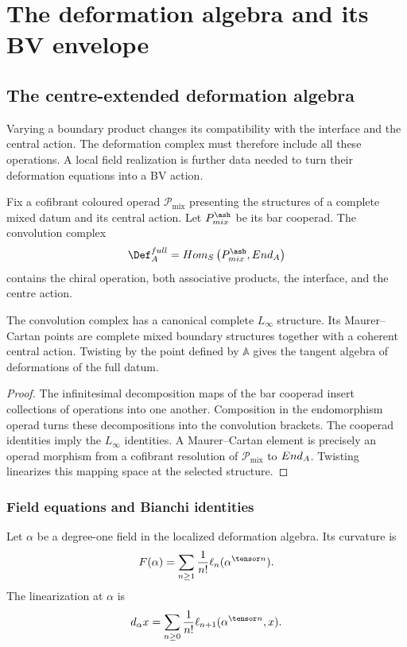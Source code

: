 \part{The deformation algebra and its BV envelope}


\chapter{The centre-extended deformation algebra}
Varying a boundary product changes its compatibility with the interface and the central action. The deformation complex must therefore include all these operations. A local field realization is further data needed to turn their deformation equations into a BV action.

Fix a cofibrant coloured operad $\mathcal P_{\mathrm{mix}}$ presenting the structures of a complete mixed datum and its central action.  Let $\mathcal P_{\mathrm{mix}}^{\ash}$ be its bar cooperad.  The convolution complex
\[
 \Def_{\mathbb A}^{\mathrm{full}}
 =\Hom_{\mathbb S}
 \left(\mathcal P_{\mathrm{mix}}^{\ash},\End_{\mathbb A}\right)
\]
contains the chiral operation, both associative products, the interface, and the centre action.

\begin{theorem}
The convolution complex has a canonical complete $L_\infty$ structure.  Its Maurer--Cartan points are complete mixed boundary structures together with a coherent central action.  Twisting by the point defined by $\mathbb A$ gives the tangent algebra of deformations of the full datum.
\end{theorem}
\begin{proof}
The infinitesimal decomposition maps of the bar cooperad insert collections of operations into one another.  Composition in the endomorphism operad turns these decompositions into the convolution brackets.  The cooperad identities imply the $L_\infty$ identities.  A Maurer--Cartan element is precisely an operad morphism from a cofibrant resolution of $\mathcal P_{\mathrm{mix}}$ to $End_{A}$.  Twisting linearizes this mapping space at the selected structure.
\end{proof}

\section{Field equations and Bianchi identities}
Let $\alpha$ be a degree-one field in the localized deformation algebra.  Its curvature is
\[
 \mathcal F(\alpha)
 =\sum_{n\ge1}\frac1{n!}\ell_n(\alpha^{\tensor n}).
\]
The linearization at $\alpha$ is
\[
 d_\alpha x
 =\sum_{n\ge0}\frac1{n!}
   \ell_{n+1}(\alpha^{\tensor n},x).
\]

